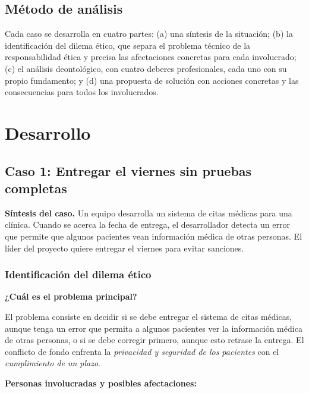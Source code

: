 \documentclass[12pt,a4paper,oneside]{article}
\newcommand{\rotulo}[1]{\par\Needspace{5\baselineskip}\noindent\textbf{#1}\par\nobreak}
\begin{document}
\subsection{Método de análisis}

Cada caso se desarrolla en cuatro partes: (a) una síntesis de la situación; (b) la identificación del dilema ético, que separa el problema técnico de la responsabilidad ética y precisa las afectaciones concretas para cada involucrado; (c) el análisis deontológico, con cuatro deberes profesionales, cada uno con su propio fundamento; y (d) una propuesta de solución con acciones concretas y las consecuencias para todos los involucrados.

\section{Desarrollo}

\subsection{Caso 1: Entregar el viernes sin pruebas completas}

\textbf{Síntesis del caso.} Un equipo desarrolla un sistema de citas médicas para una clínica. Cuando se acerca la fecha de entrega, el desarrollador detecta un error que permite que algunos pacientes vean información médica de otras personas. El líder del proyecto quiere entregar el viernes para evitar sanciones.

\subsubsection{Identificación del dilema ético}

\rotulo{¿Cuál es el problema principal?}

El problema consiste en decidir si se debe entregar el sistema de citas médicas, aunque tenga un error que permita a algunos pacientes ver la información médica de otras personas, o si se debe corregir primero, aunque esto retrase la entrega. El conflicto de fondo enfrenta la \emph{privacidad y seguridad de los pacientes} con el \emph{cumplimiento de un plazo}.

\rotulo{Personas involucradas y posibles afectaciones:}
\end{document}
